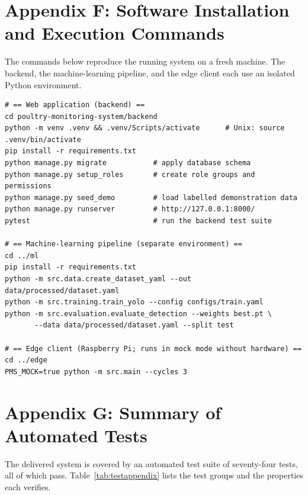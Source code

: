 \documentclass[12pt,a4paper]{report}
\begin{document}
\chapter*{Appendix F: Software Installation and Execution Commands}

The commands below reproduce the running system on a fresh machine. The backend, the machine-learning pipeline, and the edge client each use an isolated Python environment.

\begin{lstlisting}[basicstyle=\scriptsize\ttfamily,breaklines=true,frame=single,columns=fullflexible,xleftmargin=0.3cm]
# == Web application (backend) ==
cd poultry-monitoring-system/backend
python -m venv .venv && .venv/Scripts/activate      # Unix: source .venv/bin/activate
pip install -r requirements.txt
python manage.py migrate           # apply database schema
python manage.py setup_roles       # create role groups and permissions
python manage.py seed_demo         # load labelled demonstration data
python manage.py runserver         # http://127.0.0.1:8000/
pytest                             # run the backend test suite

# == Machine-learning pipeline (separate environment) ==
cd ../ml
pip install -r requirements.txt
python -m src.data.create_dataset_yaml --out data/processed/dataset.yaml
python -m src.training.train_yolo --config configs/train.yaml
python -m src.evaluation.evaluate_detection --weights best.pt \
       --data data/processed/dataset.yaml --split test

# == Edge client (Raspberry Pi; runs in mock mode without hardware) ==
cd ../edge
PMS_MOCK=true python -m src.main --cycles 3
\end{lstlisting}

\clearpage


\setcounter{table}{0}
\setcounter{figure}{0}
\renewcommand{\thetable}{G.\arabic{table}}
\renewcommand{\thefigure}{G.\arabic{figure}}
\chapter*{Appendix G: Summary of Automated Tests}

The delivered system is covered by an automated test suite of seventy-four tests, all of which pass. Table~\ref{tab:testappendix} lists the test groups and the properties each verifies.
\end{document}
